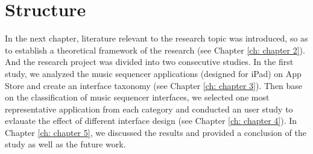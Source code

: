 \section{Structure}

In the next chapter, literature relevant to the research topic was introduced, so as to establish a theoretical framework of the research (see Chapter \ref{ch: chapter 2}). And the research project was divided into two consecutive studies. In the first study, we analyzed the music sequencer applications (designed for iPad) on App Store and create an interface taxonomy (see Chapter \ref{ch: chapter 3}). Then base on the classification of music sequencer interfaces, we selected one most representative application from each category and conducted an user study to evlauate the effect of different interface design (see Chapter \ref{ch: chapter 4}). In Chapter \ref{ch: chapter 5}, we discussed the results and provided a conclusion of the study as well as the future work.
